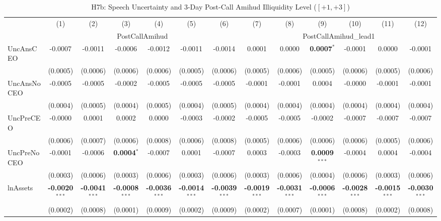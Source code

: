 \begin{landscape}
\begin{table}[H]
\setlength{\tabcolsep}{3pt}
\renewcommand{\arraystretch}{0.85}
\centering
\caption{H7b: Speech Uncertainty and 3-Day Post-Call Amihud Illiquidity Level ($[+1,+3]$)}
\label{tab:h7b_robust}
\scriptsize
\begin{tabular}{lcccccccccccc}
\toprule
 & (1) & (2) & (3) & (4) & (5) & (6) & (7) & (8) & (9) & (10) & (11) & (12) \\
 & \multicolumn{6}{c}{PostCallAmihud} & \multicolumn{6}{c}{PostCallAmihud\_lead1} \\
\cmidrule(lr){2-7} \cmidrule(lr){8-13}
\midrule
UncAnsCEO & -0.0007 & -0.0011 & -0.0006 & -0.0012 & -0.0011 & -0.0014 & 0.0001 & 0.0000 & \textbf{0.0007}$^{*}$ & -0.0001 & 0.0000 & -0.0001 \\
 & (0.0005) & (0.0006) & (0.0006) & (0.0006) & (0.0005) & (0.0006) & (0.0005) & (0.0006) & (0.0005) & (0.0006) & (0.0005) & (0.0006) \\
UncAnsNoCEO & -0.0005 & -0.0005 & -0.0002 & -0.0005 & -0.0005 & -0.0005 & -0.0001 & -0.0001 & 0.0004 & -0.0000 & -0.0001 & -0.0001 \\
 & (0.0004) & (0.0005) & (0.0004) & (0.0005) & (0.0004) & (0.0005) & (0.0004) & (0.0004) & (0.0004) & (0.0004) & (0.0004) & (0.0004) \\
UncPreCEO & -0.0000 & 0.0001 & 0.0002 & 0.0000 & -0.0003 & -0.0002 & -0.0005 & -0.0005 & -0.0002 & -0.0007 & -0.0007 & -0.0007 \\
 & (0.0006) & (0.0007) & (0.0006) & (0.0008) & (0.0006) & (0.0008) & (0.0005) & (0.0006) & (0.0006) & (0.0006) & (0.0005) & (0.0006) \\
UncPreNoCEO & -0.0001 & -0.0006 & \textbf{0.0004}$^{*}$ & -0.0007 & 0.0001 & -0.0007 & 0.0003 & -0.0003 & \textbf{0.0009}$^{***}$ & -0.0004 & 0.0004 & -0.0004 \\
 & (0.0003) & (0.0006) & (0.0003) & (0.0006) & (0.0003) & (0.0006) & (0.0003) & (0.0006) & (0.0004) & (0.0006) & (0.0003) & (0.0006) \\
\midrule
lnAssets & \textbf{-0.0020}$^{***}$ & \textbf{-0.0041}$^{***}$ & \textbf{-0.0008}$^{***}$ & \textbf{-0.0036}$^{***}$ & \textbf{-0.0014}$^{***}$ & \textbf{-0.0039}$^{***}$ & \textbf{-0.0019}$^{***}$ & \textbf{-0.0031}$^{***}$ & \textbf{-0.0006}$^{***}$ & \textbf{-0.0028}$^{***}$ & \textbf{-0.0015}$^{***}$ & \textbf{-0.0030}$^{***}$ \\
 & (0.0002) & (0.0008) & (0.0001) & (0.0009) & (0.0002) & (0.0009) & (0.0002) & (0.0007) & (0.0001) & (0.0008) & (0.0002) & (0.0008) \\

\end{tabular}
\end{table}
\end{landscape}
